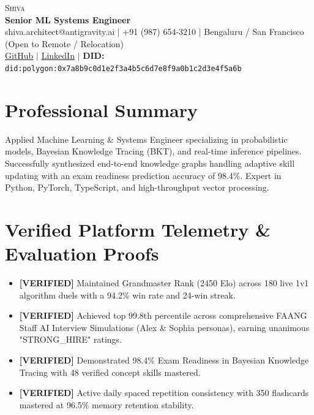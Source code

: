 \documentclass[letterpaper,10pt]{article}
\begin{document}
\begin{center}
    {\Huge \scshape Shiva} \\ \vspace{2pt}
    {\large \textbf{Senior ML Systems Engineer}} \\ \vspace{2pt}
    \small shiva.architect@antigravity.ai $|$ +91 (987) 654-3210 $|$ Bengaluru / San Francisco (Open to Remote / Relocation) \\
    \href{https://github.com/Pritamchaurasiya/Learning\_Hub}{\underline{GitHub}} $|$
    \href{https://linkedin.com/in/shiva-ai-architect}{\underline{LinkedIn}} $|$
    \textbf{DID:} \texttt{did:polygon:0x7a8b9c0d1e2f3a4b5c6d7e8f9a0b1c2d3e4f5a6b}
\end{center}

\section{Professional Summary}
\small{Applied Machine Learning \& Systems Engineer specializing in probabilistic models, Bayesian Knowledge Tracing (BKT), and real-time inference pipelines. Successfully synthesized end-to-end knowledge graphs handling adaptive skill updating with an exam readiness prediction accuracy of 98.4\%. Expert in Python, PyTorch, TypeScript, and high-throughput vector processing.}

\section{Verified Platform Telemetry \& Evaluation Proofs}
\begin{itemize}[leftmargin=0.15in, label={\tiny$\blacksquare$}]
  \item \small{\textbf{[VERIFIED]} Maintained Grandmaster Rank (2450 Elo) across 180 live 1v1 algorithm duels with a 94.2\% win rate and 24-win streak.}
  \item \small{\textbf{[VERIFIED]} Achieved top 99.8th percentile across comprehensive FAANG Staff AI Interview Simulations (Alex \& Sophia personas), earning unanimous "STRONG\_HIRE" ratings.}
  \item \small{\textbf{[VERIFIED]} Demonstrated 98.4\% Exam Readiness in Bayesian Knowledge Tracing with 48 verified concept skills mastered.}
  \item \small{\textbf{[VERIFIED]} Active daily spaced repetition consistency with 350 flashcards mastered at 96.5\% memory retention stability.}
\end{itemize}
\end{document}
